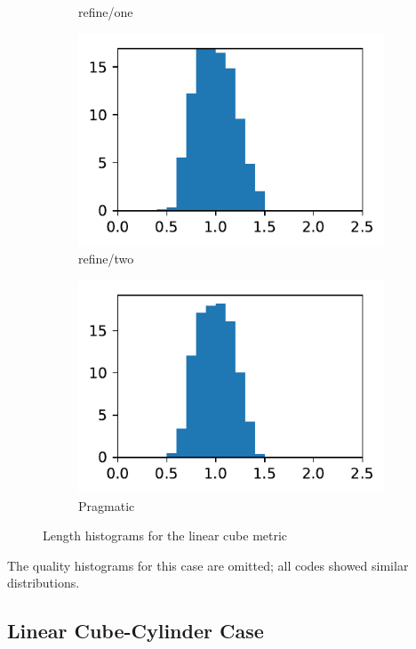 \documentclass[3p,times,procedia,number]{elsarticle}
\begin{document}
\begin{figure}
\begin{subfigure}{.16\textwidth}
\caption{refine/one}
\label{fig:cube-linear-lengths-refine-one}
\end{subfigure}
\begin{subfigure}{.16\textwidth}
\centering
\includegraphics[width=\textwidth]{refine-two-cube-linear-length.pdf}
\caption{refine/two}
\end{subfigure}
\begin{subfigure}{.16\textwidth}
\centering
\includegraphics[width=\textwidth]{pragmatic-cube-linear-length.pdf}
\caption{Pragmatic}
\end{subfigure}
\caption{Length histograms for the linear cube metric}
\label{fig:cube-linear-lengths}
\end{figure}
The quality histograms for this case are omitted;
all codes showed similar distributions.

\subsection{Linear Cube-Cylinder Case}
\end{document}
